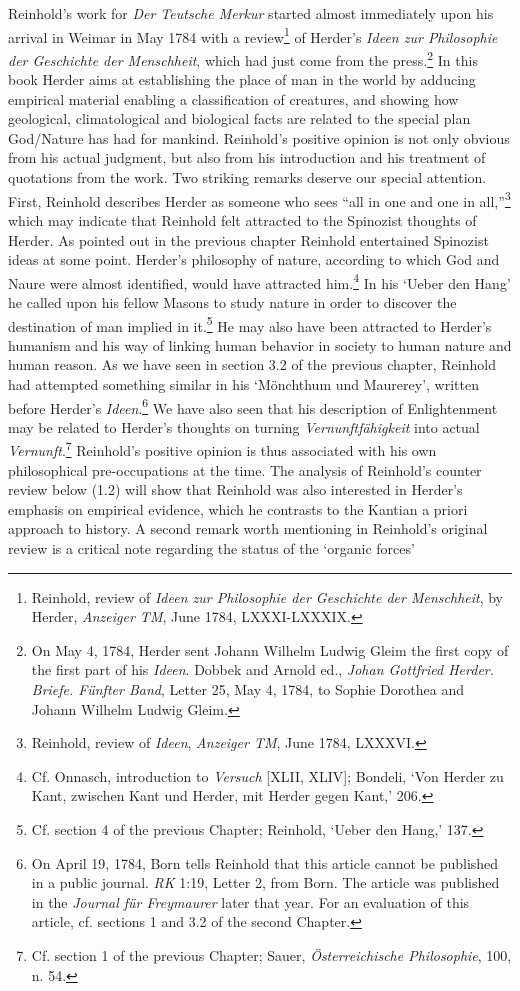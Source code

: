 Reinhold's work for \textit{Der Teutsche Merkur} started almost immediately upon his arrival in Weimar in May 1784 with a review\footnote{ Reinhold, review of \textit{Ideen zur Philosophie der Geschichte der Menschheit}, by Herder, \textit{Anzeiger TM}, June 1784, LXXXI{-}LXXXIX. } of Herder's \textit{Ideen zur Philosophie der Geschichte der Menschheit}, which had just come from the press.\footnote{ On May 4, 1784, Herder sent Johann Wilhelm Ludwig Gleim the first copy of the first part of his \textit{Ideen}. Dobbek and Arnold ed., \textit{Johan Gottfried Herder. Briefe. F\"{u}nfter Band}, Letter 25, May 4, 1784, to Sophie Dorothea and Johann Wilhelm Ludwig Gleim.} In this book Herder aims at establishing the place of man in the world by adducing empirical material enabling a classification of creatures, and showing how geological, climatological and biological facts are related to the special plan God/Nature has had for mankind. Reinhold's positive opinion is not only obvious from his actual judgment, but also from his introduction and his treatment of quotations from the work. Two striking remarks deserve our special attention. First, Reinhold describes Herder as someone who sees ``all in one and one in all,''\footnote{ Reinhold, review of \textit{Ideen}, \textit{Anzeiger TM}, June 1784, LXXXVI.} which may indicate that Reinhold felt attracted to the Spinozist thoughts of Herder. As pointed out in the previous chapter Reinhold entertained Spinozist ideas at some point. Herder's philosophy of nature, according to which God and Naure were almost identified, would have attracted him.\footnote{ Cf. Onnasch, introduction to \textit{Versuch }[XLII, XLIV]; Bondeli, `Von Herder zu Kant, zwischen Kant und Herder, mit Herder gegen Kant,' 206.} In his `Ueber den Hang' he called upon his fellow Masons to study nature in order to discover the destination of man implied in it.\footnote{ Cf. section 4 of the previous Chapter; Reinhold, `Ueber den Hang,' 137.} He may also have been attracted to Herder's humanism and his way of linking human behavior in society to human nature and human reason. As we have seen in section 3.2 of the previous chapter, Reinhold had attempted something similar in his `M\"{o}nchthum und Maurerey', written before Herder's \textit{Ideen}.\footnote{ On April 19, 1784, Born tells Reinhold that this article cannot be published in a public journal. \textit{RK} 1:19, Letter 2, from Born. The article was published in the \textit{Journal f\"{u}r Freymaurer} later that year. For an evaluation of this article, cf. sections 1 and 3.2 of the second Chapter. } We have also seen that his description of Enlightenment may be related to Herder's thoughts on turning \textit{Vernunftf\"{a}higkeit }into actual \textit{Vernunft}.\footnote{ Cf. section 1 of the previous Chapter; Sauer, \textit{\"{O}sterreichische Philosophie}, 100, n. 54.} Reinhold's positive opinion is thus associated with his own philosophical pre{-}occupations at the time. The analysis of Reinhold's counter review below (1.2) will show that Reinhold was also interested in Herder's emphasis on empirical evidence, which he contrasts to the Kantian a priori approach to history. A second remark worth mentioning in Reinhold's original review is a critical note regarding the status of the `organic forces' 